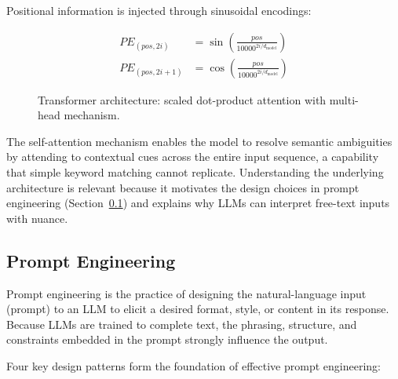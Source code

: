 \documentclass[10pt,a4paper]{article}
\begin{document}
Positional information is injected through sinusoidal encodings:

\begin{align}
PE_{(pos, 2i)} &= \sin\left(\frac{pos}{10000^{2i/d_{\text{model}}}}\right) \label{eq:positional-1} \\
PE_{(pos, 2i+1)} &= \cos\left(\frac{pos}{10000^{2i/d_{\text{model}}}}\right) \label{eq:positional-2}
\end{align}

\begin{figure}[H]
    \centering
    \caption{Transformer architecture: scaled dot-product attention with multi-head mechanism.}
    \label{fig:transformer-architecture}
\end{figure}

The self-attention mechanism enables the model to resolve semantic ambiguities by attending to contextual cues across the entire input sequence, a capability that simple keyword matching cannot replicate. Understanding the underlying architecture is relevant because it motivates the design choices in prompt engineering (Section~\ref{sec:prompt-engineering}) and explains why LLMs can interpret free-text inputs with nuance.

\subsection{Prompt Engineering}
\label{sec:prompt-engineering}

Prompt engineering is the practice of designing the natural-language input (prompt) to an LLM to elicit a desired format, style, or content in its response. Because LLMs are trained to complete text, the phrasing, structure, and constraints embedded in the prompt strongly influence the output.

Four key design patterns form the foundation of effective prompt engineering:
\end{document}
